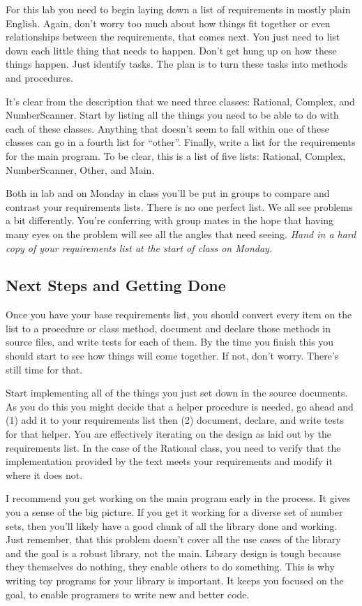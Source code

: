 \documentclass[10pt]{article}
\begin{document}
For this lab you need to begin laying down a list of requirements in mostly plain English. Again, don't worry too much about how things fit together or even relationships between the requirements, that comes next.  You just need to list down each little thing that needs to happen. Don't get hung up on how these things happen. Just identify tasks. The plan is to turn these tasks into methods and procedures. 

It's clear from the description that we need three classes: Rational, Complex, and NumberScanner. Start by listing all the things you need to be able to do with each of these classes.  Anything that doesn't seem to fall within one of these classes can go in a fourth list for ``other''. Finally, write a list for the requirements for the main program. To be clear, this is a list of five lists: Rational, Complex, NumberScanner, Other, and Main. 

Both in lab and on Monday in class you'll be put in groups to compare and contrast your requirements lists. There is no one perfect list. We all see problems a bit differently. You're conferring with group mates in the hope that having many eyes on the problem will see all the angles that need seeing. \textit{Hand in a hard copy of your requirements list at the start of class on Monday.}

\subsection{Next Steps and Getting Done}

Once you have your base requirements list, you should convert every item on the list to a procedure or class method, document and declare those methods in source files, and write tests for each of them. By the time you finish this you should start to see how things will come together. If not, don't worry. There's still time for that.

Start implementing all of the things you just set down in the source documents. As you do this you might decide that a helper procedure is needed, go ahead and (1) add it to your requirements list then (2) document, declare, and write tests for that helper. You are effectively iterating on the design as laid out by the requirements list. In the case of the Rational class, you need to verify that the implementation provided by the text meets your requirements and modify it where it does not. 

I recommend you get working on the main program early in the process. It gives you a sense of the big picture. If you get it working for a diverse set of number sets, then you'll likely have a good chunk of all the library done and working. Just remember, that this problem doesn't cover all the use cases of the library and the goal is a robust library, not the main. Library design is tough because they themselves do nothing, they enable others to do something. This is why writing toy programs for your library is important. It keeps you focused on the goal, to enable programers to write new and better code.          
\end{document}

